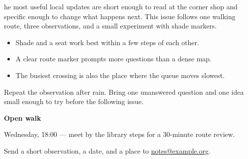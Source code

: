\documentclass[10pt]{article}
\begin{document}
\MakePaperHeader
{}
he most useful local updates are short enough to read at the
corner shop and specific enough to change what happens next. This issue
follows one walking route, three observations, and a small experiment with
shade markers.

\begin{itemize}
  \item Shade and a seat work best within a few steps of each other.
  \item A clear route marker prompts more questions than a dense map.
  \item The busiest crossing is also the place where the queue moves slowest.
\end{itemize}

Repeat the observation after rain. Bring one unanswered question and one idea
small enough to try before the following issue.

\textbf{Open walk}\par
Wednesday, 18:00 --- meet by the library steps for a 30-minute route review.

\medskip
Send a short observation, a date, and a place to
\href{mailto:notes@example.org}{notes@example.org}.
\EndNewsColumns
\end{document}
